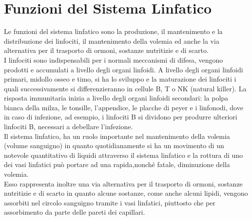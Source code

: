 \section{Funzioni del Sistema Linfatico}
Le funzioni del sistema linfatico sono la produzione, il mantenimento e la distribuzione dei linfociti, 
il mantenimento della volemia ed anche la via alternativa per il trasporto di ormoni,
sostanze nutritizie e di scarto\cite{BOOK1}.\\
I linfociti sono indispensabili per i normali meccanismi di difesa, vengono prodotti e accumulati a livello 
degli organi linfoidi. 
A livello degli organi linfoidi primari, midollo osseo e timo, si ha lo sviluppo e la maturazione dei linfociti 
i quali successivamente si differenzieranno in cellule B, T o NK (natural killer)\cite{BOOK1}.
La risposta immunitaria inizia a livello degli organi linfoidi secondari: la polpa bianca della milza, le tonsille, 
l’appendice, le placche di peyer e i linfonodi, dove in caso di infezione, ad esempio,
i linfociti B si dividono per produrre ulteriori linfociti B, necessari a debellare l’infezione.\\
Il sistema linfatico, ha un ruolo importante nel mantenimento della volemia (volume sanguigno) in quanto 
quotidianamente si ha un movimento di un notevole quantitativo di liquidi attraverso il sistema linfatico e 
la rottura di uno dei vasi linfatici può portare ad una rapida,nonché fatale, diminuzione della volemia\cite{BOOK1}.\\
Esso rappresenta inoltre una via alternativa per il trasporto di ormoni, sostanze nutritizie e 
di scarto in quanto alcune sostanze, come anche alcuni lipidi, vengono assorbiti nel circolo sanguigno tramite 
i vasi linfatici, piuttosto che per assorbimento da parte delle pareti dei capillari\cite{BOOK1}.\\

